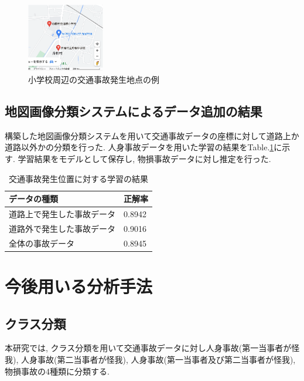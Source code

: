\documentclass[a4j,8.5pt, twocolumn,fleqn]{jbook}
\begin{document}
\begin{figure}[htb]
    \centering
    \includegraphics[height=30mm]{images/shougakkou_gmap.png}
    \vspace{-3mm}
    \caption{小学校周辺の交通事故発生地点の例}
    \label{shougakkou_gmap}
\end{figure}

\subsection{地図画像分類システムによるデータ追加の結果}
構築した地図画像分類システムを用いて交通事故データの座標に対して道路上か道路以外かの分類を行った. 
人身事故データを用いた学習の結果をTable.\ref{table_road}に示す. 
学習結果をモデルとして保存し, 物損事故データに対し推定を行った. 


\begin{table}[htb]
    \centering
    \caption{交通事故発生位置に対する学習の結果}
    \label{table_road}
    \begin{tabular}{|l|l|}
        \hline
        \textbf{データの種類} & \textbf{正解率} \\ \hline
        道路上で発生した事故データ   & 0.8942       \\ \hline
        道路外で発生した事故データ   & 0.9016       \\ \hline
        全体の事故データ        & 0.8945       \\ \hline
    \end{tabular}
\end{table}



\section{今後用いる分析手法}
\subsection{クラス分類}
本研究では, クラス分類を用いて交通事故データに対し人身事故(第一当事者が怪我), 人身事故(第二当事者が怪我), 人身事故(第一当事者及び第二当事者が怪我), 物損事故の4種類に分類する. 
\end{document}
